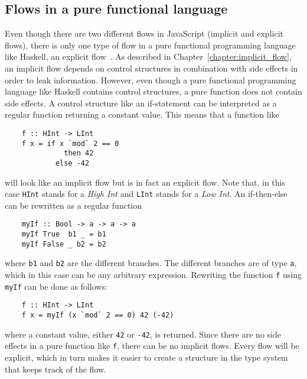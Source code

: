 \subsection{Flows in a pure functional language}
Even though there are two different flows in JavaScript (implicit and explicit flows), there is only one type of flow in a pure functional programming language like Haskell, an explicit flow~\cite{seclib}. As described in Chapter~\ref{chapter:implicit_flow}, an implicit flow depends on control structures in combination with side effects in order to leak information. However, even though a pure functional programming language like Haskell contains control structures, a pure function does not contain side effects. A control structure like an if-statement can be interpreted as a regular function returning a constant value. This means that a function like
\begin{verbatim}
    f :: HInt -> LInt
    f x = if x `mod` 2 == 0
              then 42
            else -42
\end{verbatim}
will look like an implicit flow but is in fact an explicit flow. Note that, in this case {\tt HInt} stands for a \emph{High Int} and {\tt LInt} stands for a \emph{Low Int}. An if-then-else can be rewritten as a regular function~\cite{if-then-else}
\begin{verbatim}
    myIf :: Bool -> a -> a -> a
    myIf True  b1 _ = b1
    myIf False _ b2 = b2
\end{verbatim}
where {\tt b1} and {\tt b2} are the different branches. The different branches are of type {\tt a}, which in this case can be any arbitrary expression. Rewriting the function {\tt f} using {\tt myIf} can be done as follows:
\begin{verbatim}
    f :: HInt -> LInt
    f x = myIf (x `mod` 2 == 0) 42 (-42)
\end{verbatim}
where a constant value, either {\tt 42} or {\tt -42}, is returned. Since there are no side effects in a pure function like {\tt f}, there can be no implicit flows. Every flow will be explicit, which in turn makes it easier to create a structure in the type system that keeps track of the flow.

